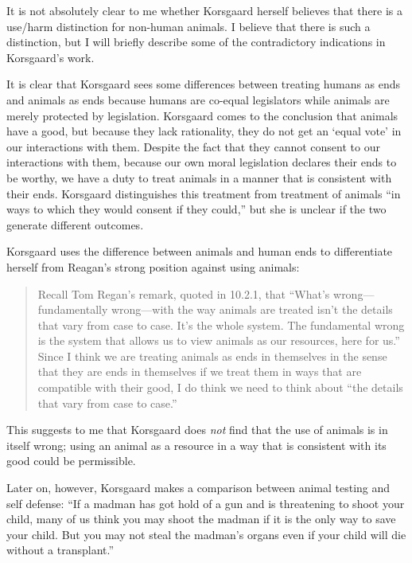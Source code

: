 		It is not absolutely clear to me whether Korsgaard herself believes
		that there is a use/harm distinction for non-human animals. I believe
		that there is such a distinction, but I will briefly describe some of
		the contradictory indications in Korsgaard’s work.

		It is clear that Korsgaard sees some differences between treating
		humans as ends and animals as ends because humans are co-equal
		legislators while animals are merely protected by legislation.
		Korsgaard comes to the conclusion that animals have a good, but because
		they lack rationality, they do not get an ‘equal vote’ in our
		interactions with them.\autocite[12.2.1]{korsgaard_fellow_creatures}
		Despite the fact that they cannot consent to our interactions with
		them, because our own moral legislation declares their ends to be
		worthy, we have a duty to treat animals in a manner that is consistent
		with their ends.\autocite[12.2.1]{korsgaard_fellow_creatures} Korsgaard
		distinguishes this treatment from treatment of animals “in ways to
		which they would consent if they could,” but she is unclear if the two
		generate different
		outcomes.\autocite[12.2.1]{korsgaard_fellow_creatures}

		Korsgaard uses the difference between animals and human ends to
		differentiate herself from Reagan’s strong position against using
		animals:
		\begin{quote}
			Recall Tom Regan’s remark, quoted in 10.2.1, that “What’s
			wrong— fundamentally wrong—with the way animals are treated isn’t
			the details that vary from case to case. It’s the whole system. The
			fundamental wrong is the system that allows us to view animals as
			our resources, here for us.” Since I think we are treating animals
			as ends in themselves in the sense that they are ends in themselves
			if we treat them in ways that are compatible with their good, I do
			think we need to think about “the details that vary from case to
			case.”\autocite[12.2.1]{korsgaard_fellow_creatures}
		\end{quote}
		This suggests to me that Korsgaard does \emph{not} find that the use of
		animals is in itself wrong; using an animal as a resource in a way that
		is consistent with its good could be permissible.

		Later on, however, Korsgaard makes a comparison between animal testing
		and self defense: “If a madman has got hold of a gun and is threatening
		to shoot your child, many of us think you may shoot the madman if it is
		the only way to save your child. But you may not steal the madman’s
		organs even if your child will die without a
		transplant.”\autocite[12.5.2]{korsgaard_fellow_creatures}

